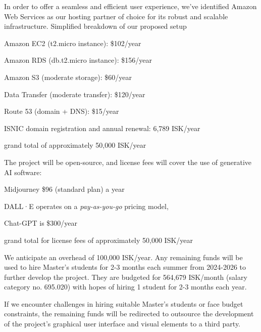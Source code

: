 \documentclass{article}
\begin{document}
    In order to offer a seamless and efficient user experience, we've identified Amazon Web Services as our
    hosting partner of choice for its robust and scalable infrastructure.
    Simplified breakdown of our proposed setup
    \begin{enumerate*}[itemjoin*={{, for }}]
        \item Amazon EC2 (t2.micro instance): \$102/year
        \item Amazon RDS (db.t2.micro instance): \$156/year
        \item Amazon S3 (moderate storage): \$60/year
        \item Data Transfer (moderate transfer): \$120/year
        \item Route 53 (domain + DNS): \$15/year
        \item ISNIC domain registration and annual renewal: 6,789 ISK/year
        \item grand total of approximately 50,000 ISK/year
    \end{enumerate*}

    The project will be open-source, and license fees will cover the use of generative AI software:
    \begin{enumerate*}[itemjoin*={{, for }}]
        \item Midjourney \$96 (standard plan) a year
        \item DALL·E operates on a \emph{pay-as-you-go} pricing model,
        \item Chat-GPT is \$300/year
        \item grand total for license fees of approximately 50,000 ISK/year
    \end{enumerate*}

    We anticipate an overhead of 100,000 ISK/year. Any remaining funds will be used to hire Master's students for 2-3
    months each summer from 2024-2026 to further develop the project.
    They are budgeted for 564,679 ISK/month (salary category no. 695.020) with hopes of hiring 1 student for 2-3
    months each year.

    If we encounter challenges in hiring suitable Master's students or face budget constraints, the remaining funds
    will be redirected to outsource the development of the project's graphical user interface and visual elements to
    a third party.


    
\end{document}
